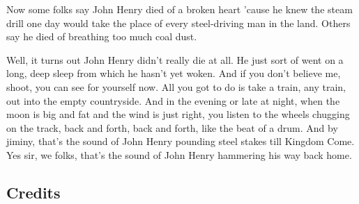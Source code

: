 Now some folks say John Henry died of a broken heart 'cause he knew the steam drill one day would take the place of every steel-driving man in the land. Others say he died of breathing too much coal dust.

Well, it turns out John Henry didn't really die at all. He just sort of went on a long, deep sleep from which he hasn't yet woken. And if you don't believe me, shoot, you can see for yourself now. All you got to do is take a train, any train, out into the empty countryside. And in the evening or late at night, when the moon is big and fat and the wind is just right, you listen to the wheels chugging on the track, back and forth, back and forth, like the beat of a drum. And by jiminy, that's the sound of John Henry pounding steel stakes till Kingdom Come. Yes sir, we folks, that's the sound of John Henry hammering his way back home.

\subsection{Credits}
